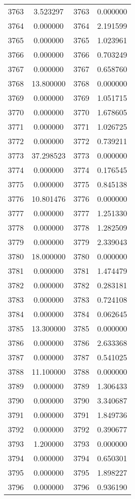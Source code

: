 \documentclass[12pt]{article}
\begin{document}
\begin{longtable}{@{}cccc@{}}
3763 & 3.523297 & 3763 & 0.000000 \\
3764 & 0.000000 & 3764 & 2.191599 \\
3765 & 0.000000 & 3765 & 1.023961 \\
3766 & 0.000000 & 3766 & 0.703249 \\
3767 & 0.000000 & 3767 & 0.658760 \\
3768 & 13.800000 & 3768 & 0.000000 \\
3769 & 0.000000 & 3769 & 1.051715 \\
3770 & 0.000000 & 3770 & 1.678605 \\
3771 & 0.000000 & 3771 & 1.026725 \\
3772 & 0.000000 & 3772 & 0.739211 \\
3773 & 37.298523 & 3773 & 0.000000 \\
3774 & 0.000000 & 3774 & 0.176545 \\
3775 & 0.000000 & 3775 & 0.845138 \\
3776 & 10.801476 & 3776 & 0.000000 \\
3777 & 0.000000 & 3777 & 1.251330 \\
3778 & 0.000000 & 3778 & 1.282509 \\
3779 & 0.000000 & 3779 & 2.339043 \\
3780 & 18.000000 & 3780 & 0.000000 \\
3781 & 0.000000 & 3781 & 1.474479 \\
3782 & 0.000000 & 3782 & 0.283181 \\
3783 & 0.000000 & 3783 & 0.724108 \\
3784 & 0.000000 & 3784 & 0.062645 \\
3785 & 13.300000 & 3785 & 0.000000 \\
3786 & 0.000000 & 3786 & 2.633368 \\
3787 & 0.000000 & 3787 & 0.541025 \\
3788 & 11.100000 & 3788 & 0.000000 \\
3789 & 0.000000 & 3789 & 1.306433 \\
3790 & 0.000000 & 3790 & 3.340687 \\
3791 & 0.000000 & 3791 & 1.849736 \\
3792 & 0.000000 & 3792 & 0.390677 \\
3793 & 1.200000 & 3793 & 0.000000 \\
3794 & 0.000000 & 3794 & 0.650301 \\
3795 & 0.000000 & 3795 & 1.898227 \\
3796 & 0.000000 & 3796 & 0.936190 \\

\end{longtable}
\end{document}
